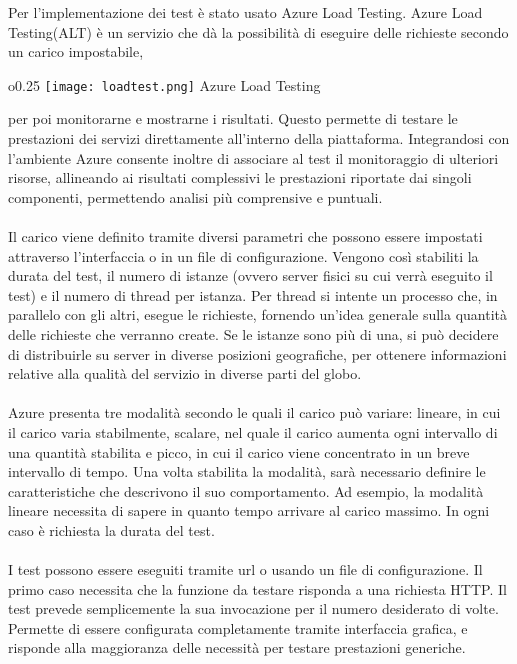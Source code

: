Per l'implementazione dei test è stato usato Azure Load Testing.
Azure Load Testing(ALT) è un servizio che dà la possibilità
di eseguire delle richieste secondo un carico impostabile,
\begin{wrapfigure}{o}{0.25\textwidth}
    \centering
    \texttt{[image: loadtest.png]}
    Azure Load Testing
\end{wrapfigure}
per poi monitorarne e mostrarne i risultati.
Questo permette di testare le prestazioni dei servizi direttamente all'interno della piattaforma.
Integrandosi con l'ambiente Azure
consente inoltre di associare al test il monitoraggio di ulteriori risorse,  
allineando ai risultati complessivi le prestazioni riportate dai singoli componenti, 
permettendo analisi più comprensive e puntuali.\\
\\
Il carico viene definito tramite diversi parametri che possono essere impostati 
attraverso l'interfaccia o in un file di configurazione.
Vengono così stabiliti la durata del test, il numero di istanze (ovvero server fisici su cui verrà eseguito il test)
e il numero di thread per istanza.
Per thread si intente un processo che, in parallelo con gli altri, 
esegue le richieste, 
fornendo un'idea generale sulla quantità delle richieste che verranno create.
Se le istanze sono più di una,
si può decidere di distribuirle su server in diverse posizioni geografiche,
per ottenere informazioni relative alla qualità del servizio in diverse parti del globo.\\
\\
Azure presenta tre modalità secondo le quali il carico può variare: 
lineare, in cui il carico varia stabilmente, 
scalare, nel quale il carico aumenta ogni intervallo di una quantità stabilita e
picco, in cui il carico viene concentrato in un breve intervallo di tempo.
Una volta stabilita la modalità, sarà necessario definire le caratteristiche 
che descrivono il suo comportamento. 
Ad esempio, la modalità lineare necessita di sapere in quanto tempo arrivare al carico massimo.
In ogni caso è richiesta la durata del test.\\
\\
I test possono essere eseguiti tramite url o usando un file di configurazione.
Il primo caso necessita che la funzione da testare risponda a una richiesta HTTP.
Il test prevede semplicemente la sua invocazione per il numero desiderato di volte.
Permette di essere configurata completamente tramite interfaccia grafica,
e risponde alla maggioranza delle necessità per testare prestazioni generiche.
